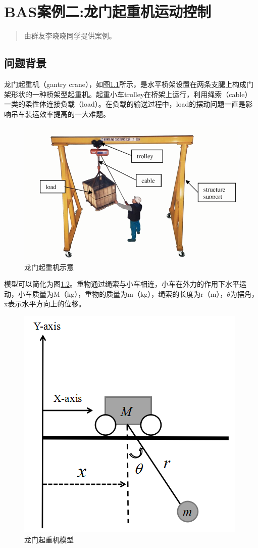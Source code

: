 \documentclass[]{ctexbook}
\begin{document}
\chapter{BAS案例二:龙门起重机运动控制}\label{examples2}

\begin{quote}
由群友李晓晓同学提供案例。
\end{quote}

\section{问题背景}

龙门起重机（gantry
crane），如图\ref{fig:gc}所示，是水平桥架设置在两条支腿上构成门架形状的一种桥架型起重机。起重小车trolley在桥架上运行，利用绳索（cable）一类的柔性体连接负载（load）。在负载的输送过程中，load的摆动问题一直是影响吊车装运效率提高的一大难题。

\begin{figure}

{\centering \includegraphics[width=0.7\linewidth]{img/gc} 

}

\caption{龙门起重机示意}\label{fig:gc}
\end{figure}

模型可以简化为图\ref{fig:gc2}。重物通过绳索与小车相连，小车在外力的作用下水平运动，小车质量为M（kg），重物的质量为m（kg），绳索的长度为r（m），\(\theta\)为摆角，x表示水平方向上的位移。

\begin{figure}

{\centering \includegraphics[width=0.6\linewidth]{img/gc2} 

}

\caption{龙门起重机模型}\label{fig:gc2}
\end{figure}
\end{document}
